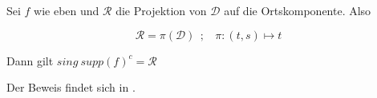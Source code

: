 \begin{corollary}
\label{cor:psi_ast_misst_sing_supp}
Sei $f$ wie eben und $\mathcal{R}$ die Projektion von $\mathcal{D}$ auf die  Ortskomponente. Also

\begin{equation*}
    \mathcal{R} = \pi (\mathcal{D})~~;~~~~
    \pi : (t,s) \mapsto t
\end{equation*}

Dann gilt $sing ~supp (f)^c = \mathcal{R}$
\end{corollary}

Der Beweis findet sich in \cite{Kutyniok2008}.

